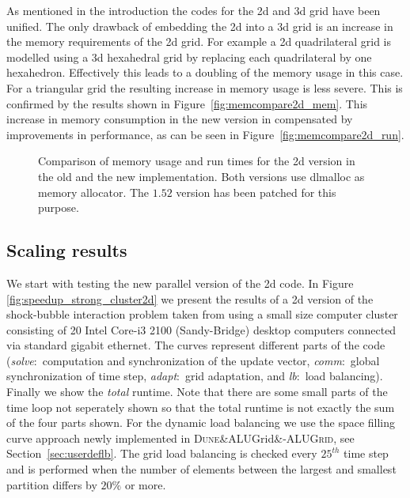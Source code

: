 \documentclass[10pt,notitlepage,a4paper]{article}
\newcommand{\dune}[1][]{\textsc{Dune}\ifx&#1&\else\textsc{-{#1}}\fi\xspace}
\begin{document}
As mentioned in the introduction the codes for the 2d and 3d grid have been unified. 
The only drawback of embedding the 2d into a 3d
grid is an increase in the memory requirements of the 2d grid. For example a 2d
quadrilateral grid is modelled using a 3d hexahedral grid by replacing each quadrilateral by one
hexahedron. Effectively this leads to a doubling of the memory usage in this case.
For a triangular grid the resulting increase in memory usage is less severe.
This is confirmed by the results shown in Figure~\ref{fig:memcompare2d_mem}.
This increase in memory consumption in the new version in compensated by
improvements in performance, as can be seen in Figure~\ref{fig:memcompare2d_run}.

\begin{figure}
  \caption{Comparison of memory usage and run times for the 2d version
           in the old and the new implementation. Both versions use
           dlmalloc as memory allocator. The $1.52$ version has been patched for this purpose.}
  \label{fig:memcompare2d}
\end{figure}

\subsection{Scaling results}
We start with testing the new parallel version of the 2d code.
In Figure \ref{fig:speedup_strong_cluster2d} we present the results of a 2d
version of the shock-bubble interaction problem taken from \cite{limiter:11} 
using a small size computer cluster consisting of 20 Intel Core-i3 2100 (Sandy-Bridge)
desktop computers connected via standard gigabit ethernet.
The curves represent different parts of the code
(\emph{solve}:\ computation and synchronization of the update vector,
\emph{comm}:\ global synchronization of time step,
\emph{adapt}:\ grid adaptation, and
\emph{lb}:\ load balancing).
Finally we show the \emph{total} runtime. Note that there are some small
parts of the time loop not seperately shown so that the total runtime is
not exactly the sum of the four parts shown. 
For the dynamic load
balancing we use the space filling curve approach newly implemented in
\dune[ALUGrid], see Section~\ref{sec:userdeflb}.
The grid load balancing is checked every $25^{th}$ time step and 
is performed when the number of elements between the largest
and smallest partition differs by $20\%$ or more. 
\end{document}
